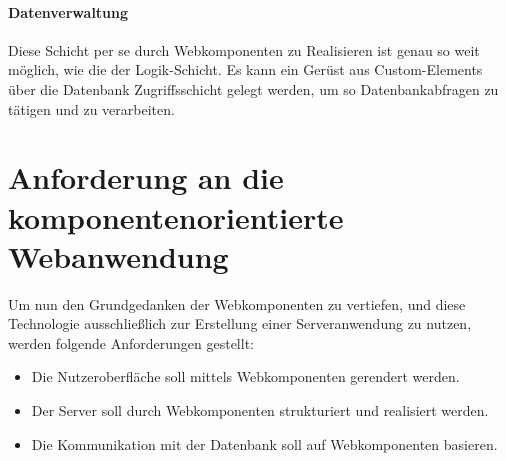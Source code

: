 \paragraph{Datenverwaltung}Diese Schicht per se durch Webkomponenten zu Realisieren ist genau so weit möglich, wie die der Logik-Schicht. Es kann ein Gerüst aus Custom-Elements über die Datenbank Zugriffsschicht gelegt werden, um so Datenbankabfragen zu tätigen und zu verarbeiten. 


\section{Anforderung an die komponentenorientierte Webanwendung}
Um nun den Grundgedanken der Webkomponenten zu vertiefen, und diese Technologie ausschließlich zur Erstellung einer Serveranwendung zu nutzen, werden folgende Anforderungen gestellt:
	\begin{itemize}
	\item Die Nutzeroberfläche soll mittels Webkomponenten gerendert werden.
	\item Der Server soll durch Webkomponenten strukturiert und realisiert werden.
	\item Die Kommunikation mit der Datenbank soll auf Webkomponenten basieren.
\end{itemize}


